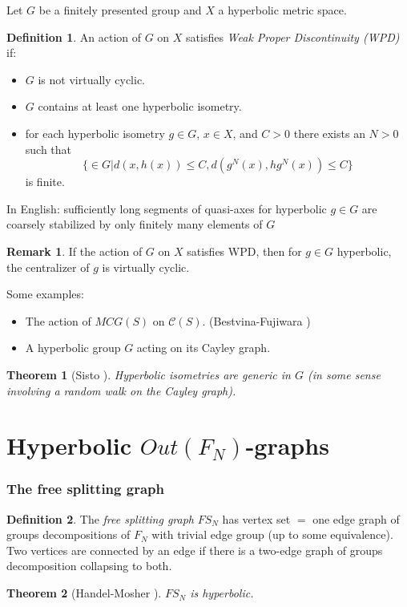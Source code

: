 \documentclass{beamer}
\theoremstyle{theorem}
\newtheorem{thm}{Theorem}
\theoremstyle{definition}
\newtheorem*{defin}{Definition}
\newtheorem*{remark}{Remark}
\renewcommand{\-}{\ensuremath{^{-1}}}
\renewcommand{\>}{\ensuremath{\rightarrow}}
\renewcommand{\(}{\langle}
\renewcommand{\)}{\rangle}
\begin{document}
\begin{frame}
Let $G$ be a finitely presented group and $X$ a hyperbolic metric space.
\pause
\begin{defin}
An action of $G$ on $X$ satisfies \emph{Weak Proper Discontinuity (WPD)} if:
\pause
\begin{itemize}
\item $G$ is not virtually cyclic.
\pause
\item $G$ contains at least one hyperbolic isometry.
\pause
\item for each hyperbolic isometry $g \in G$, $x \in X$, and $C >0$ there exists an $N > 0$ such that $$\{  \in G | d(x,h(x)) \leq C, d(g^N(x), hg^N(x)) \leq C \}$$ is finite.
\end{itemize}
\end{defin}
\pause
In English: sufficiently long segments of quasi-axes for hyperbolic $g \in G$ are coarsely stabilized by only finitely many elements of $G$
\end{frame}

\begin{frame}
\begin{remark}
If the action of $G$ on $X$ satisfies WPD, then for $g \in G$ hyperbolic, the centralizer of $g$ is virtually cyclic.
\end{remark}
\pause
Some examples:
\pause
\begin{itemize}
\item The action of $MCG(S)$ on $\mathcal{C}(S)$. (Bestvina-Fujiwara \cite{BF02})
\pause
\item A hyperbolic group $G$ acting on its Cayley graph.
\end{itemize}
\pause
\begin{thm}[Sisto \cite{Sisto13}]
Hyperbolic isometries are generic in $G$ (in some sense involving a random walk on the Cayley graph).
\end{thm}
\end{frame}

\section{Hyperbolic $Out(F_N)$-graphs}

\begin{frame}
\frametitle{The free splitting graph}
\begin{defin}
The \emph{free splitting graph} $FS_N$ has vertex set $=$ one edge graph of groups decompositions of $F_N$ with trivial edge group (up to some equivalence). Two vertices are connected by an edge if there is a two-edge graph of groups decomposition collapsing to both.
\end{defin}
\pause
\begin{thm}[Handel-Mosher \cite{HandelMosher}]
$FS_N$ is hyperbolic.
\end{thm}
\end{frame}
\end{document}
